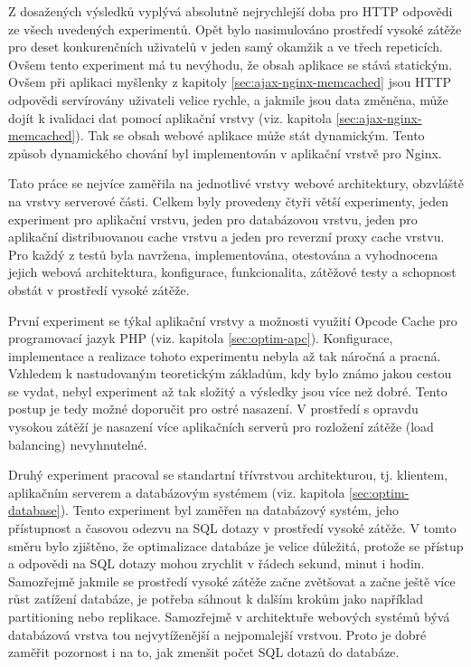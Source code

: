 \documentclass[12pt]{article}
\begin{document}
Z dosažených výsledků vyplývá absolutně nejrychlejší doba pro HTTP odpovědi ze všech uvedených experimentů. Opět bylo nasimulováno prostředí vysoké zátěže pro deset konkurenčních uživatelů v jeden samý okamžik a ve třech repeticích. Ovšem tento experiment má tu nevýhodu, že obsah aplikace se stává statickým. Ovšem při aplikaci myšlenky z kapitoly \ref{sec:ajax-nginx-memcached} jsou HTTP odpovědi servírovány uživateli velice rychle, a jakmile jsou data změněna, může dojít k ivalidaci dat pomocí aplikační vrstvy (viz. kapitola \ref{sec:ajax-nginx-memcached}). Tak se obsah webové aplikace může stát dynamickým. Tento způsob dynamického chování byl implementován v aplikační vrstvě pro Nginx.

\obrazek
{}

\clearpage

\obrazek
{}



Tato práce se nejvíce zaměřila na jednotlivé vrstvy webové architektury, obzvláště na vrstvy serverové části. Celkem byly provedeny čtyři větší experimenty, jeden experiment pro aplikační vrstvu, jeden pro databázovou vrstvu, jeden pro aplikační distribuovanou cache vrstvu a jeden pro reverzní proxy cache vrstvu. Pro každý z testů byla navržena, implementována, otestována a vyhodnocena jejich webová architektura, konfigurace, funkcionalita, zátěžové testy a schopnost obstát v prostředí vysoké zátěže.

První experiment se týkal aplikační vrstvy a možnosti využití Opcode Cache pro programovací jazyk PHP (viz. kapitola \ref{sec:optim-apc}). Konfigurace, implementace a realizace tohoto experimentu nebyla až tak náročná a pracná. Vzhledem k nastudovaným teoretickým základům, kdy bylo známo jakou cestou se vydat, nebyl experiment až tak složitý a výsledky jsou více než dobré. Tento postup je tedy možné doporučit pro ostré nasazení. V prostředí s opravdu vysokou zátěží je nasazení více aplikačních serverů pro rozložení zátěže (load balancing) nevyhnutelné.

Druhý experiment pracoval se standartní třívrstvou architekturou, tj. klientem, aplikačním serverem a databázovým systémem (viz. kapitola \ref{sec:optim-database}). Tento experiment byl zaměřen na databázový systém, jeho přístupnost a časovou odezvu na SQL dotazy v prostředí vysoké zátěže. V tomto směru bylo zjištěno, že optimalizace databáze je velice důležitá, protože se přístup a odpovědi na SQL dotazy mohou zrychlit v řádech sekund, minut i hodin. Samozřejmě jakmile se prostředí vysoké zátěže začne zvětšovat a začne ještě více růst zatížení databáze, je potřeba sáhnout k dalším krokům jako například partitioning nebo replikace. Samozřejmě v architektuře webových systémů bývá databázová vrstva tou nejvytíženější a nejpomalejší vrstvou. Proto je dobré zaměřit pozornost i na to, jak zmenšit počet SQL dotazů do databáze.
\end{document}

